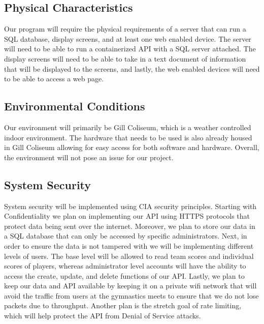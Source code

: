 \documentclass[letterpaper,10pt,draftclsnofoot,onecolumn,]{article}
\begin{document}
\subsection{Physical Characteristics}
Our program will require the physical requirements of a server that can run a SQL database, display screens, and at least one web enabled device. The server will need to be able to run a containerized API with a SQL server attached. The display screens will need to be able to take in a text document of information that will be displayed to the screens, and lastly, the web enabled devices will need to be able to access a web page.

\subsection{Environmental Conditions}
Our environment will primarily be Gill Coliseum, which is a weather controlled indoor environment. The hardware that needs to be used is also already housed in Gill Coliseum allowing for easy access for both software and hardware. Overall, the environment will not pose an issue for our project.

\subsection{System Security}
System security will be implemented using CIA security principles. Starting with Confidentiality we plan on implementing our API using HTTPS protocols that protect data being sent over the internet. Moreover, we plan to store our data in a SQL database that can only be accessed by specific administrators. Next, in order to ensure the data is not tampered with we will be implementing different levels of users. The base level will be allowed to read team scores and individual scores of players, whereas administrator level accounts will have the ability to access the create, update, and delete functions of our API. Lastly, we plan to keep our data and API available by keeping it on a private wifi network that will avoid the traffic from users at the gymnastics meets to ensure that we do not lose packets due to throughput. Another plan is the stretch goal of rate limiting, which will help protect the API from Denial of Service attacks.
\end{document}
